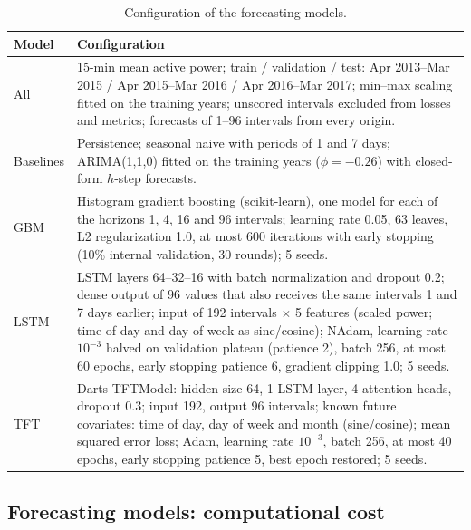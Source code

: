 \begin{table}[H]
\centering
\caption{Configuration of the forecasting models.}
\label{tab:forecast_repro}
\small
\begin{tabular}{l p{13.2cm}}
\toprule
Model & Configuration \\
\midrule
All & 15-min mean active power; train / validation / test: Apr 2013--Mar 2015 / Apr 2015--Mar 2016 / Apr 2016--Mar 2017; min--max scaling fitted on the training years; unscored intervals excluded from losses and metrics; forecasts of 1--96 intervals from every origin. \\
Baselines & Persistence; seasonal naive with periods of 1 and 7 days; ARIMA(1,1,0) fitted on the training years ($\phi = -0.26$) with closed-form $h$-step forecasts. \\
GBM & Histogram gradient boosting (scikit-learn), one model for each of the horizons 1, 4, 16 and 96 intervals; learning rate 0.05, 63 leaves, L2 regularization 1.0, at most 600 iterations with early stopping (10\% internal validation, 30 rounds); 5 seeds. \\
LSTM & LSTM layers 64--32--16 with batch normalization and dropout 0.2; dense output of 96 values that also receives the same intervals 1 and 7 days earlier; input of 192 intervals $\times$ 5 features (scaled power; time of day and day of week as sine/cosine); NAdam, learning rate $10^{-3}$ halved on validation plateau (patience 2), batch 256, at most 60 epochs, early stopping patience 6, gradient clipping 1.0; 5 seeds. \\
TFT & Darts TFTModel: hidden size 64, 1 LSTM layer, 4 attention heads, dropout 0.3; input 192, output 96 intervals; known future covariates: time of day, day of week and month (sine/cosine); mean squared error loss; Adam, learning rate $10^{-3}$, batch 256, at most 40 epochs, early stopping patience 5, best epoch restored; 5 seeds. \\
\bottomrule
\end{tabular}
\end{table}

\subsection*{Forecasting models: computational cost}

